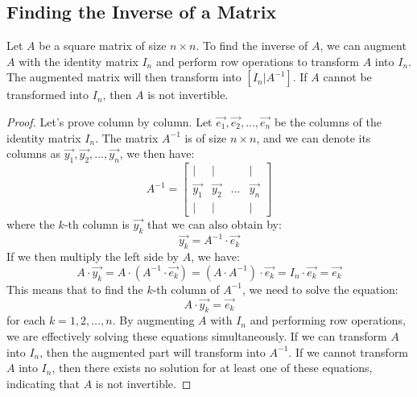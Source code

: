 \subsection{Finding the Inverse of a Matrix}
\begin{theorem}
    Let $A$ be a square matrix of size $n \times n$. To find the inverse of $A$, we can augment $A$ with the identity matrix $I_n$ and perform row operations to transform $A$ into $I_n$. The augmented matrix will then transform into $[I_n | A^{-1}]$. If $A$ cannot be transformed into $I_n$, then $A$ is not invertible.
\end{theorem}
\begin{proof}
    Let's prove column by column. Let $\vec{e_1}, \vec{e_2}, ..., \vec{e_n}$ be the columns of the identity matrix $I_n$. The matrix $A^{-1}$ is of size $n \times n$, and we can denote its columns as $\vec{y_1}, \vec{y_2}, ..., \vec{y_n}$, we then have:
    \[
        A^{-1} = \begin{bmatrix}
            | & | &        & | \\
            \vec{y_1} & \vec{y_2} & ... & \vec{y_n} \\
            | & | &        & |
        \end{bmatrix}
    \]
    where the $k$-th column is $\vec{y_k}$ that we can also obtain by:
    \[
        \vec{y_k} = A^{-1} \cdot \vec{e_k}
    \]
    If we then multiply the left side by $A$, we have:
    \[
        A \cdot \vec{y_k} = A \cdot (A^{-1} \cdot \vec{e_k}) = (A \cdot A^{-1}) \cdot \vec{e_k} = I_n \cdot \vec{e_k} = \vec{e_k}
    \]
    This means that to find the $k$-th column of $A^{-1}$, we need to solve the equation:
    \[
        A \cdot \vec{y_k} = \vec{e_k}
    \]
    for each $k = 1, 2, ..., n$. By augmenting $A$ with $I_n$ and performing row operations, we are effectively solving these equations simultaneously. If we can transform $A$ into $I_n$, then the augmented part will transform into $A^{-1}$. If we cannot transform $A$ into $I_n$, then there exists no solution for at least one of these equations, indicating that $A$ is not invertible.
\end{proof}

